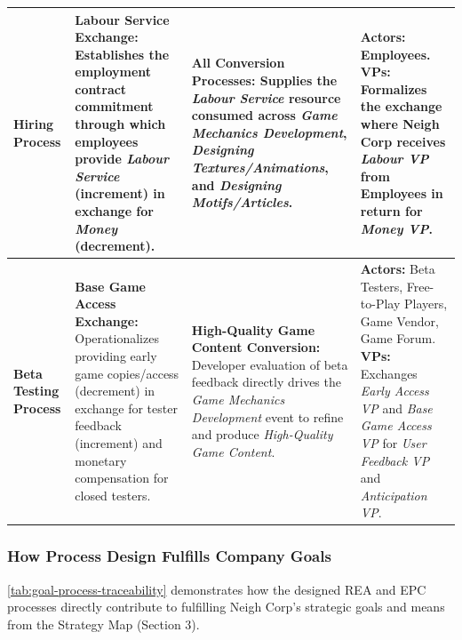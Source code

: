 \documentclass{article}
\begin{document}
{\begin{longtable}{L{0.16\textwidth} L{0.26\textwidth} L{0.26\textwidth} L{0.26\textwidth}}
    \textbf{Hiring Process} 
    & \textbf{Labour Service Exchange:} Establishes the employment contract commitment through which employees provide \textit{Labour Service} (increment) in exchange for \textit{Money} (decrement). 
    & \textbf{All Conversion Processes:} Supplies the \textit{Labour Service} resource consumed across \textit{Game Mechanics Development}, \textit{Designing Textures/Animations}, and \textit{Designing Motifs/Articles}. 
    & \textbf{Actors:} Employees.\newline
      \textbf{VPs:} Formalizes the exchange where Neigh Corp receives \textit{Labour VP} from Employees in return for \textit{Money VP}. \\
    \midrule

    \textbf{Beta Testing Process} 
    & \textbf{Base Game Access Exchange:} Operationalizes providing early game copies/access (decrement) in exchange for tester feedback (increment) and monetary compensation for closed testers. 
    & \textbf{High-Quality Game Content Conversion:} Developer evaluation of beta feedback directly drives the \textit{Game Mechanics Development} event to refine and produce \textit{High-Quality Game Content}. 
    & \textbf{Actors:} Beta Testers, Free-to-Play Players, Game Vendor, Game Forum.\newline
      \textbf{VPs:} Exchanges \textit{Early Access VP} and \textit{Base Game Access VP} for \textit{User Feedback VP} and \textit{Anticipation VP}. \\
\end{longtable}
}

\subsubsection{How Process Design Fulfills Company Goals}
\autoref{tab:goal-process-traceability} demonstrates how the designed REA and EPC processes directly contribute to fulfilling Neigh Corp's strategic goals and means from the Strategy Map (Section 3).
\end{document}
